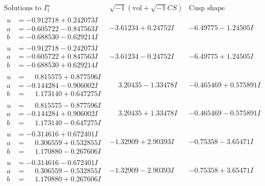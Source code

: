 \documentclass[1p]{elsarticle_modified}
\theoremstyle{definition}
\newcommand{\I}{\sqrt{-1}}
\begin{document}
$$\begin{array}{c|c|c}  
\text{Solutions to }I^u_{1}& \I (\text{vol} + \sqrt{-1}CS) & \text{Cusp shape}\\
 \hline 
\begin{aligned}
u &= -0.912718 + 0.242073 I \\
a &= -0.605722 - 0.847563 I \\
b &= -0.688530 - 0.629214 I\end{aligned}
 & -3.61234 + 0.24752 I & -6.49775 - 1.24505 I \\ \hline\begin{aligned}
u &= -0.912718 - 0.242073 I \\
a &= -0.605722 + 0.847563 I \\
b &= -0.688530 + 0.629214 I\end{aligned}
 & -3.61234 - 0.24752 I & -6.49775 + 1.24505 I \\ \hline\begin{aligned}
u &= \phantom{-}0.815575 + 0.877596 I \\
a &= -0.144284 - 0.906002 I \\
b &= \phantom{-}1.173140 + 0.647275 I\end{aligned}
 & \phantom{-}3.20435 - 1.33478 I & -0.465469 + 0.575891 I \\ \hline\begin{aligned}
u &= \phantom{-}0.815575 - 0.877596 I \\
a &= -0.144284 + 0.906002 I \\
b &= \phantom{-}1.173140 - 0.647275 I\end{aligned}
 & \phantom{-}3.20435 + 1.33478 I & -0.465469 - 0.575891 I \\ \hline\begin{aligned}
u &= -0.314616 + 0.672401 I \\
a &= \phantom{-}0.306559 + 0.532855 I \\
b &= \phantom{-}1.170880 - 0.267606 I\end{aligned}
 & -1.32909 + 2.90393 I & -0.75358 - 3.65471 I \\ \hline\begin{aligned}
u &= -0.314616 - 0.672401 I \\
a &= \phantom{-}0.306559 - 0.532855 I \\
b &= \phantom{-}1.170880 + 0.267606 I\end{aligned}
 & -1.32909 - 2.90393 I & -0.75358 + 3.65471 I \\ \hline\begin{aligned}

\end{aligned}
\end{array}$$
\end{document}
